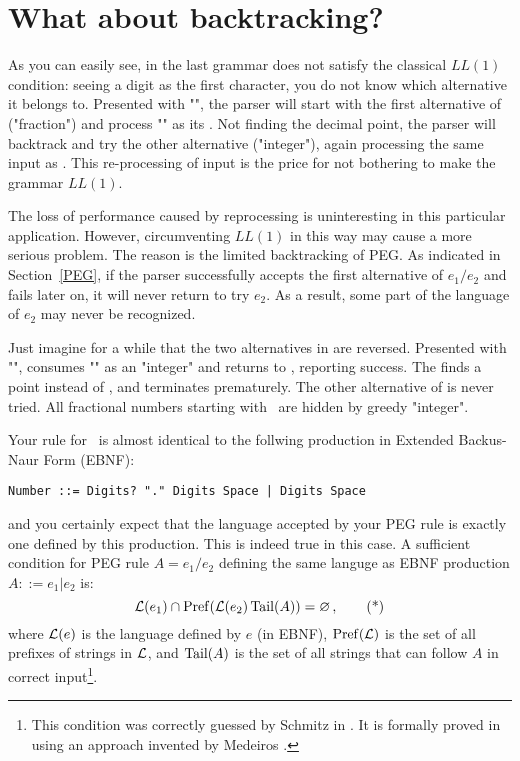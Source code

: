 
\section{What about backtracking?\label{back}}


As you can easily see,  in the last grammar
does not satisfy the classical $LL(1)$ condition:
seeing a digit as the first character,
you do not know which alternative it belongs to.
Presented with "", the parser will start with
the first alternative of  ("fraction")
and process "" as its \Digits. 
Not finding the decimal point, the parser will backtrack and try
the other alternative ("integer"),
again processing the same input as \Digits.
This re-processing of input is the price for not bothering
to make the grammar $LL(1)$.

The loss of performance caused by reprocessing is uninteresting
in this particular application.
However, circumventing $LL(1)$ in this way may cause a more serious problem.
The reason is the limited backtracking of PEG.
As indicated in Section~\ref{PEG}, 
if the parser successfully accepts the first alternative 
of $e_1 / e_2$ and fails later on, 
it will never return to try $e_2$.
As a result, some part of the language of $e_2$ may never be recognized.

Just imagine for a while that the two alternatives in 
are reversed. 
Presented with "",  consumes "" as an "integer"
and returns to , reporting success.
The  finds a point instead of , 
and terminates prematurely. 
The other alternative of  is never tried.
All fractional numbers starting with \Digits\ are hidden by greedy "integer".

Your rule for \Number\ is almost identical to the follwing production
in Extended Backus-Naur Form (EBNF):

\small
\begin{Verbatim}[samepage=true,xleftmargin=15mm,baselinestretch=0.8]
 Number ::= Digits? "." Digits Space | Digits Space
\end{Verbatim}
\normalsize

and you certainly expect that the language accepted by your PEG rule
is exactly one defined by this production.
This is indeed true in this case.
A sufficient condition 
for PEG rule $A = e_1 / e_2$ defining the same languge
as EBNF production $A ::= e_1 | e_2$ is:
%
\begin{equation}\label{star}
\mathcal{L}(e_1) \cap \operatorname{Pref}(\mathcal{L}(e_2)\operatorname{Tail}(A)) = \varnothing\,, \tag{*}
\end{equation}
%
where $\mathcal{L}(e)$ is the language defined by $e$ (in EBNF),
$\operatorname{Pref}(\mathcal{L})$ is the set of all prefixes of strings in $\mathcal{L}$,
and $\operatorname{Tail}(A)$ is the set of all strings that can follow $A$ in correct input\footnote{
This condition was correctly guessed by Schmitz in \cite{Schmitz:2006}.
It is formally proved in \cite{Redz:2013:FI}
using an approach invented by Medeiros \cite{Medeiros:PhD,Medeiros:2014}.}.

